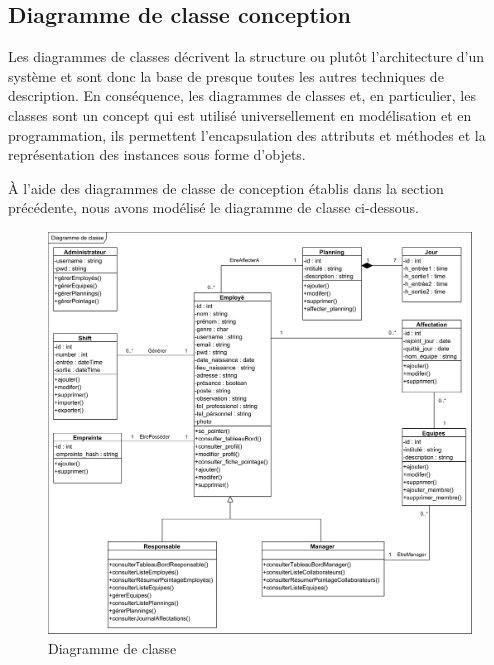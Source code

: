 \begin{itemize}
\section{Diagramme de classe conception}
Les diagrammes de classes décrivent la structure ou plutôt l’architecture d’un système et sont donc la base de presque toutes les autres techniques de description. En conséquence, les diagrammes de classes et, en particulier, les classes sont un concept qui est utilisé universellement en modélisation et en programmation, ils permettent l’encapsulation des attributs et méthodes et la représentation des instances sous forme d’objets\cite{10}.

À l’aide des diagrammes de classe de conception établis dans la section précédente, nous avons modélisé le diagramme de classe ci-dessous.

        \begin{figure}[h!]
                 \centering
                \includegraphics[scale=0.69]{images/DCC/Diagramme de classe.png}
                 \caption{Diagramme de classe}
                 \label{fig47}
        \end{figure}


\end{itemize}
